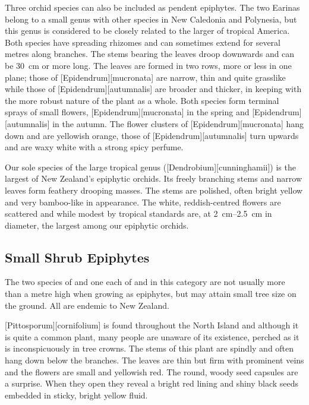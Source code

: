 Three orchid species can also be included as pendent epiphytes.
The two Earinas belong to a small genus with other species in New Caledonia and Polynesia, but this genus is considered to be closely related to the larger  of tropical America.
Both species have spreading rhizomes and can sometimes extend for several metres along branches.
The stems bearing the leaves droop downwards and can be \SI{30}{\centi\metre} or more long.
The leaves are formed in two rows, more or less in one plane; those of [Epidendrum][mucronata] are narrow, thin and quite grasslike while those of [Epidendrum][autumnalis] are broader and thicker, in keeping with the more robust nature of the plant as a whole.
Both species form terminal sprays of small flowers, [Epidendrum][mucronata] in the spring and [Epidendrum][autumnalis] in the autumn.
The flower clusters of [Epidendrum][mucronata] hang down and are yellowish orange, those of [Epidendrum][autumnalis] turn upwards and are waxy white with a strong spicy perfume.

Our sole species of the large tropical genus  ([Dendrobium][cunninghamii]) is the largest of New Zealand's epiphytic orchids.
Its freely branching stems and narrow leaves form feathery drooping masses.
The stems are polished, often bright yellow and very bamboo-like in appearance.
The white, reddish-centred flowers are scattered and while modest by tropical standards are, at \SIrange{2}{2.5}{\centi\metre} in diameter, the largest among our epiphytic orchids.

\subsection{Small Shrub Epiphytes}

The two species of  and one each of  and  in this category are not usually more than a metre high when growing as epiphytes, but may attain small tree size on the ground.
All are endemic to New Zealand.

[Pittosporum][cornifolium] is found throughout the North Island and although it is quite a common plant, many people are unaware of its existence, perched as it is inconspicuously in tree crowns.
The stems of this plant are spindly and often hang down below the branches.
The leaves are thin but firm with prominent veins and the flowers are small and yellowish red.
The round, woody seed capsules are a surprise.
When they open they reveal a bright red lining and shiny black seeds embedded in sticky, bright yellow fluid.

